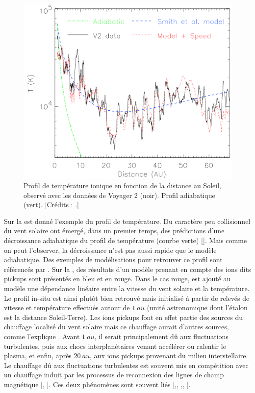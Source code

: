 \begin{figure}[!ht]
 \centering
\includegraphics[width=0.8\linewidth,trim=0.5cm 0cm 0cm 0cm, clip=true]{./Mainmatter/Part_0/images/heating_profil}
\cprotect\caption{Profil de température ionique en fonction de la distance au Soleil, observé avec les données de Voyager 2 (noir). Profil adiabatique (vert).  [Crédits : \cite{richardson_radial_2003}.]}
\label{fig:profil}
\end{figure}
Sur la  est donné l'exemple du profil de température. Du caractère peu collisionnel du vent solaire ont émergé, dans un premier temps, des prédictions d'une décroissance adiabatique du profil de température (courbe verte) [\cite{tu_mhd_1995}]. Mais comme on peut l'observer, la décroissance n'est pas aussi rapide que le modèle adiabatique. Des exemples de modélisations pour retrouver ce profil sont référencés par \cite{richardson_radial_2003}. Sur la , des résultats d'un modèle prenant en compte des ions dits \og pickups \fg{} sont présentés en bleu et en rouge. Dans le cas rouge, est ajouté au modèle une dépendance linéaire entre la vitesse du vent solaire et la température. Le profil in-situ est ainsi plutôt bien retrouvé mais initialisé à partir de relevés de vitesse et température effectués autour de $\SI{1}{au}$ (unité astronomique dont l'étalon est la distance Soleil-Terre). Les ions pickups font en effet partie des sources du chauffage localisé du vent solaire mais ce chauffage aurait d'autres sources, comme l'explique \cite{david_energy_2022}. 
Avant $\SI{1}{au}$, il serait principalement dû aux fluctuations turbulentes, puis aux chocs interplanétaires venant accélérer ou ralentir le plasma, et enfin, après $\SI{20}{au}$, aux ions pickups provenant du milieu interstellaire. Le chauffage dû aux fluctuations turbulentes est souvent mis en compétition avec un chauffage induit par les processus de reconnexion des lignes de champ magnétique [\cite{matthaeus_who_2011}, \cite{cranmer_role_2015}]. Ces deux phénomènes sont souvent liés [\cite{sundkvist_dissipation_2007},\cite{retino_situ_2007}, \cite{servidio_magnetic_2011},\cite{chasapis_thin_2015}, \cite{manzini_subion-scale_2023}].  

